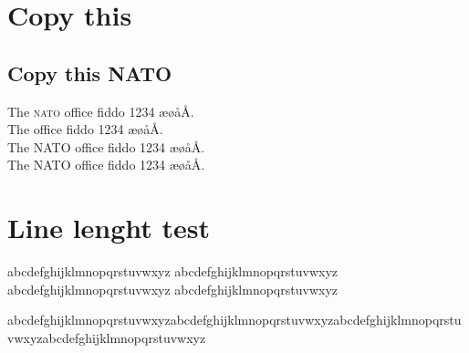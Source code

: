 \chapter{Copy this }
\section {Copy this \textsc{NATO}}
The \textsc{nato} office fiddo 1234 æøåÅ.\\
The  office fiddo 1234 æøåÅ.\\
The {NATO} office fiddo 1234 æøåÅ.\\
{The {NATO} office fiddo 1234 æøåÅ.}\\


\chapter{Line lenght test}
abcdefghijklmnopqrstuvwxyz abcdefghijklmnopqrstuvwxyz abcdefghijklmnopqrstuvwxyz
abcdefghijklmnopqrstuvwxyz

\noindent a\-b\-c\-d\-e\-f\-g\-h\-i\-j\-k\-l\-m\-n\-o\-p\-q\-r\-s\-t\-u\-v\-w\-x\-y\-z\-a\-b\-c\-d\-e\-f\-g\-h\-i\-j\-k\-l\-m\-n\-o\-p\-q\-r\-s\-t\-u\-v\-w\-x\-y\-z\-a\-b\-c\-d\-e\-f\-g\-h\-i\-j\-k\-l\-m\-n\-o\-p\-q\-r\-s\-t\-u\-v\-w\-x\-y\-z\-a\-b\-c\-d\-e\-f\-g\-h\-i\-j\-k\-l\-m\-n\-o\-p\-q\-r\-s\-t\-u\-v\-w\-x\-y\-z
